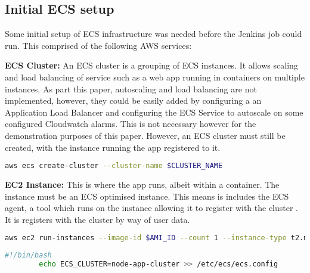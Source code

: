 	\subsection{Initial ECS setup}
	Some initial setup of ECS infrastructure was needed before the Jenkins job could run. This comprised of the following AWS services:
	
	\medbreak
	
	\noindent \textbf{ECS Cluster:}  An ECS cluster is a grouping of ECS instances. It allows scaling and load balancing of service such as a web app running in containers on multiple instances. As part this paper, autoscaling and load balancing are not implemented, however, they could be easily added by configuring a an Application Load Balancer and configuring the ECS Service to autoscale on some configured Cloudwatch alarms. This is not necessary however for the demonstration purposes of this paper. However, an ECS cluster must still be created, with the instance running the app registered to it.
	
	\begin{minipage}{\textwidth}
		\begin{lstlisting}[caption={Create ECS Cluster},language=bash]
		aws ecs create-cluster --cluster-name $CLUSTER_NAME
		\end{lstlisting}
	\end{minipage}
	
	\noindent \textbf{EC2 Instance:} This is where the app runs, albeit within a container. The instance must be an ECS optimised instance. This means is includes the ECS agent, a tool which runs on the instance allowing it to register with the cluster \citep{aws-agent}. It is registers with the cluster by way of user data.
	
	\begin{minipage}{\textwidth}
		\begin{lstlisting}[caption={Create EC2 Instance},label={create-instance},language=bash]
		aws ec2 run-instances --image-id $AMI_ID --count 1 --instance-type t2.micro --key-name $KEY_NAME --security-groups $HTTPSSH_SEC_GROUP $HTTP_GITHUB --iam-instance-profile Name=$ECS_INSTANCE_ROLE --user-data file://user-data --tag-specifications 'ResourceType=instance,Tags=[{Key=Name,Value='$INSTANCE_NAME'}]'
		\end{lstlisting}
	\end{minipage}
	
	\begin{minipage}{\textwidth}
		\begin{lstlisting}[caption={User Data},language=bash]
		#!/bin/bash	
		echo ECS_CLUSTER=node-app-cluster >> /etc/ecs/ecs.config	
		\end{lstlisting}
	\end{minipage}
	
